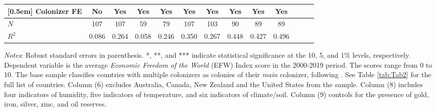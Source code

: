 \begin{sidewaystable}[h!]
\begin{threeparttable}
\begin{center}
\begin{minipage}{\textwidth}
\begin{tabular*}{\textwidth}{@{\extracolsep{\fill}}lcccccccccccc@{\extracolsep{\fill}}}
[0.5em]
Colonizer FE & No & Yes & Yes& Yes& Yes& Yes& Yes& Yes& Yes\\
\hline
\(N\)       &         107         &         107         &          59         &          79         &         107         &         103         &          90         &          89         &          89         \\
\(R^{2}\)   &       0.086         &       0.264         &       0.058         &       0.246         &       0.350         &       0.267         &       0.448         &       0.427         &       0.496         \\ \hline\hline
\end{tabular*}
\begin{tablenotes}
\small
\item \textit{Notes}: Robust standard errors in parenthesis. *, **, and *** indicate statistical significance at the 10, 5, and 1\% levels, respectively. Dependent variable is the average \textit{Economic Freedom of the World} (EFW) Index score in the 2000-2019 period. The scores range from 0 to 10. The base sample classifies countries with multiple colonizers as colonies of their \textit{main} colonizer, following \cite{laporta1999quality}. See Table \ref{tab:Tab2} for the full list of countries. Column (6) excludes Australia, Canada, New Zealand and the United States from the sample. Column (8) includes four indicators of humidity, five indicators of temperature, and six indicators of climate/soil. Column (9) controls for the presence of gold, iron, silver, zinc, and oil reserves. 
\end{tablenotes}
\end{minipage}
\end{center}
\end{threeparttable}
\end{sidewaystable}

